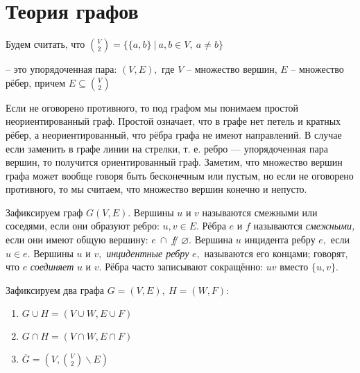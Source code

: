 
\section{Теория графов}

Будем считать, что $ \binom{V}{2} = \{ \{a, b\} \ | \ a, b \in V, \ a \neq b \}$

\begin{definition}
     -- это упорядоченная пара: $(V, E),$ где $V $ -- множество вершин, $E$ -- множество рёбер, причем $E \subseteq  \binom{V}{2}$ 
\end{definition}

Если не оговорено противного, то под графом мы понимаем простой неориентированный граф. Простой означает, что в графе нет петель и кратных рёбер, а неориентированный, что рёбра графа не имеют направлений. В случае если заменить в графе линии на стрелки, т. е. ребро — упорядоченная пара вершин, то получится ориентированный граф. Заметим, что множество вершин графа может вообще говоря быть бесконечным или пустым, но если не оговорено противного, то мы считаем, что множество вершин конечно и непусто.

\begin{definition}
Зафиксируем граф $G(V, E).$ Вершины $u$ и $v$ называются смежными или соседями, если они образуют ребро: ${u, v} \in E.$ Рёбра $e$ и $f$ называются \textit{смежными,}
если они имеют общую вершину: $e \ \cap \ f ̸ \varnothing.$ Вершина $u$ инцидента ребру $e,$ если
$u \in e.$ Вершины $u$ и $v,$ \textit{инцидентные ребру} $e,$ называются его концами; говорят,
что $e$ \textit{соединяет} $u$ и $v.$ Рёбра часто записывают сокращённо: $uv$ вместо $\{u, v \}.$ 
\end{definition}

\begin{definition}
    Зафиксируем два графа $G = (V, E), \ H = (W, F):$
    \begin{enumerate}
        \item $G \cup H = (V \cup W, E \cup F)$ \\
        \item $G \cap H = (V \cap W, E \cap F)$ \\
        \item $\overline{G} = (V,  \binom{V}{2} \backslash E)$
    \end{enumerate}
\end{definition}

